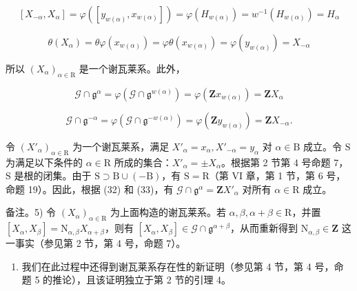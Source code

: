 \[
[ X _ {- \alpha}, X _ {\alpha} ] = \varphi ([ y _ {w (\alpha)}, x _ {w (\alpha)} ]) = \varphi (H _ {w (\alpha)}) = w ^ {- 1} (H _ {w (\alpha)}) = H _ {\alpha}
\]

\[
\theta (X _ {\alpha}) = \theta \varphi (x _ {w (\alpha)}) = \varphi \theta (x _ {w (\alpha)}) = \varphi (y _ {w (\alpha)}) = X _ {- \alpha}
\]

所以 \((X_{\alpha})_{\alpha \in \mathrm{R}}\) 是一个谢瓦莱系。此外，

\[
\mathcal {G} \cap \mathfrak {g} ^ {\alpha} = \varphi (\mathcal {G} \cap \mathfrak {g} ^ {w (\alpha)}) = \varphi (\mathbf {Z} x _ {w (\alpha)}) = \mathbf {Z} X _ {\alpha}\tag{32}
\]

\[
\mathcal {G} \cap \mathfrak {g} ^ {- \alpha} = \varphi (\mathcal {G} \cap \mathfrak {g} ^ {- w (\alpha)}) = \varphi (\mathbf {Z} y _ {w (\alpha)}) = \mathbf {Z} X _ {- \alpha}.\tag{33}
\]

令 \((X'_{\alpha})_{\alpha \in \mathrm{R}}\) 为一个谢瓦莱系，满足 \(X'_{\alpha} = x_{\alpha}, X'_{-\alpha} = y_{\alpha}\) 对 \(\alpha \in \mathrm{B}\) 成立。令 \(\mathrm{S}\) 为满足以下条件的 \(\alpha \in \mathrm{R}\) 所成的集合：\(X'_{\alpha} = \pm X_{\alpha}\)。根据第 2 节第 4 号命题 7，\(\mathrm{S}\) 是根的闭集。由于 \(\mathrm{S} \supset \mathrm{B} \cup (-\mathrm{B})\)，有 \(\mathrm{S} = \mathrm{R}\)（第 VI 章，第 1 节，第 6 号，命题 19）。因此，根据 (32) 和 (33)，有 \(\mathcal{G} \cap \mathfrak{g}^{\alpha} = \mathbf{Z}X'_{\alpha}\) 对所有 \(\alpha \in \mathrm{R}\) 成立。

备注。5) 令 \((X_{\alpha})_{\alpha \in \mathrm{R}}\) 为上面构造的谢瓦莱系。若 \(\alpha, \beta, \alpha + \beta \in \mathrm{R}\)，并置 \([X_{\alpha}, X_{\beta}] = \mathrm{N}_{\alpha, \beta} X_{\alpha + \beta}\)，则有 \([X_{\alpha}, X_{\beta}] \in \mathcal{G} \cap \mathfrak{g}^{\alpha + \beta}\)，从而重新得到 \(\mathrm{N}_{\alpha, \beta} \in \mathbf{Z}\) 这一事实（参见第 2 节，第 4 号，命题 7）。

\begin{enumerate}
\def\labelenumi{\arabic{enumi})}
\setcounter{enumi}{5}
\tightlist
\item
  我们在此过程中还得到谢瓦莱系存在性的新证明（参见第 4 节，第 4 号，命题 5 的推论），且该证明独立于第 2 节的引理 4。
\end{enumerate}

